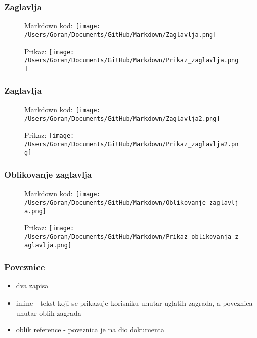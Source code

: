 \documentclass{beamer}
\begin{document}
\newpage

\begin{frame}
\frametitle{Zaglavlja}
\begin{figure}
{Markdown kod:} 
\texttt{[image: /Users/Goran/Documents/GitHub/Markdown/Zaglavlja.png]}
\end{figure}

\begin{figure}
{Prikaz:}
\texttt{[image: /Users/Goran/Documents/GitHub/Markdown/Prikaz\_zaglavlja.png]}
\end{figure}
\end{frame}

\newpage

\begin{frame}
\frametitle{Zaglavlja}
\begin{figure}
{Markdown kod:} 
\texttt{[image: /Users/Goran/Documents/GitHub/Markdown/Zaglavlja2.png]}
\end{figure}

\begin{figure}
{Prikaz:}
\texttt{[image: /Users/Goran/Documents/GitHub/Markdown/Prikaz\_zaglavlja2.png]}
\end{figure}
\end{frame}

\newpage

\begin{frame}
\frametitle{Oblikovanje zaglavlja}
\begin{figure}
{Markdown kod:} 
\texttt{[image: /Users/Goran/Documents/GitHub/Markdown/Oblikovanje\_zaglavlja.png]}
\end{figure}

\begin{figure}
{Prikaz:}
\texttt{[image: /Users/Goran/Documents/GitHub/Markdown/Prikaz\_oblikovanja\_zaglavlja.png]}
\end{figure}
\end{frame}

\newpage

\begin{frame}
\frametitle{Poveznice}
\begin{itemize}
\item dva zapisa
\item inline - tekst koji se prikazuje korisniku unutar uglatih zagrada, a poveznica unutar oblih zagrada
\item oblik reference - poveznica je na dio dokumenta 

\end{itemize}
\end{frame}
\end{document}
